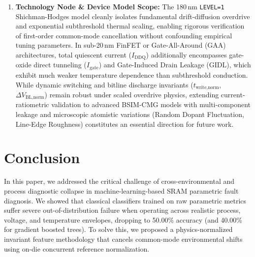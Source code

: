 \documentclass[conference]{IEEEtran}
\begin{document}
\begin{enumerate}
    \item \textbf{Technology Node \& Device Model Scope:} The 180\,nm \texttt{LEVEL=1} Shichman-Hodges model cleanly isolates fundamental drift-diffusion overdrive and exponential subthreshold thermal scaling, enabling rigorous verification of first-order common-mode cancellation without confounding empirical tuning parameters. In sub-20\,nm FinFET or Gate-All-Around (GAA) architectures, total quiescent current ($I_{\text{DDQ}}$) additionally encompasses gate-oxide direct tunneling ($I_{\text{gate}}$) and Gate-Induced Drain Leakage (GIDL), which exhibit much weaker temperature dependence than subthreshold conduction. While dynamic switching and bitline discharge invariants ($t_{\text{write,norm}}$, $\Delta V_{\text{BL,norm}}$) remain robust under scaled overdrive physics, extending current-ratiometric validation to advanced BSIM-CMG models with multi-component leakage and microscopic atomistic variations (Random Dopant Fluctuation, Line-Edge Roughness) constitutes an essential direction for future work.
\end{enumerate}


\section{Conclusion}
\label{sec:conclusion}

In this paper, we addressed the critical challenge of cross-environmental and process diagnostic collapse in machine-learning-based SRAM parametric fault diagnosis. We showed that classical classifiers trained on raw parametric metrics suffer severe out-of-distribution failure when operating across realistic process, voltage, and temperature envelopes, dropping to 50.00\% accuracy (and 40.00\% for gradient boosted trees). To solve this, we proposed a physics-normalized invariant feature methodology that cancels common-mode environmental shifts using on-die concurrent reference normalization. 
\end{document}
